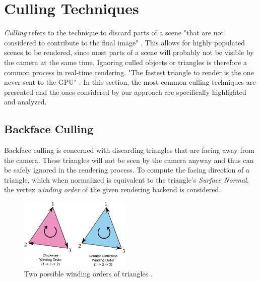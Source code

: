 \section{Culling Techniques} \label{sec-culling-techniques}

\emph{Culling} refers to the technique to discard parts of a scene "that are not considered to contribute to the final 
image" \cite{AkenineMoeller2018}. This allows for highly populated scenes to be rendered, since most parts of a scene 
will probably not be visible by the camera at the same time. Ignoring culled objects or triangles is therefore a common 
process in real-time rendering. "The fastest triangle to render is the one never sent to the \ac{GPU}" 
\cite{AkenineMoeller2018}. In this section, the most common culling techniques are presented and the ones considered by 
our approach are specifically highlighted and analyzed. 


\subsection{Backface Culling} \label{subsec-backface-culling}

Backface culling is concerned with discarding triangles that are facing away from the camera. 
These triangles will not be seen by the camera anyway and thus can be safely ignored in the rendering process. 
To compute the facing direction of a triangle, which when normalized is equivalent to the triangle's 
\emph{Surface Normal}, the vertex \emph{winding order} of the given rendering backend is considered.\\

\begin{figure}[h]
    \centering
    \includegraphics[width=200px]{images/graphics/winding-order-triangle.png}
    \caption{Two possible winding orders of triangles \cite{Michel2016}.}
    \label{fig:triangle-winding-order}
\end{figure}

